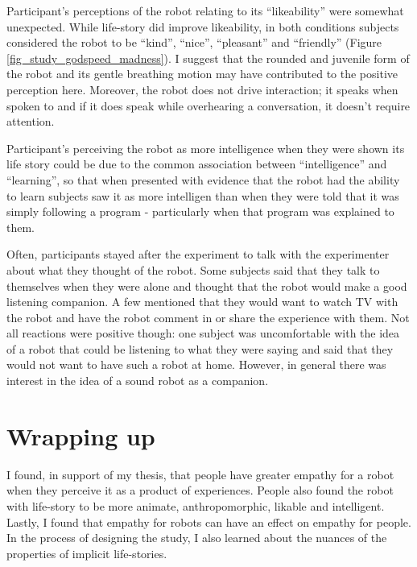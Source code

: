 Participant's perceptions of the robot relating to its ``likeability'' were somewhat unexpected. While life-story did improve likeability, in both conditions subjects considered the robot to be ``kind'', ``nice'', ``pleasant'' and ``friendly'' (Figure \ref{fig_study_godspeed_madness}). I suggest that the rounded and juvenile form of the robot and its gentle breathing motion may have contributed to the positive perception here. Moreover, the robot does not drive interaction; it speaks when spoken to and if it does speak while overhearing a conversation, it doesn't require attention.


Participant's perceiving the robot as more intelligence when they were shown its life story could be due to the common association between ``intelligence'' and ``learning'', so that when presented with evidence that the robot had the ability to learn subjects saw it as more intelligen than when they were told that it was simply following a program - particularly when that program was explained to them.

Often, participants stayed after the experiment to talk with the experimenter about what they thought of the robot. Some subjects said that they talk to themselves when they were alone and thought that the robot would make a good listening companion. A few mentioned that they would want to watch TV with the robot and have the robot comment in or share the experience with them. Not all reactions were positive though: one subject was uncomfortable with the idea of a robot that could be listening to what they were saying and said that they would not want to have such a robot at home. However, in general there was interest in the idea of a sound robot as a companion. 

 
\section{Wrapping up}

I found, in support of my thesis, that people have greater empathy for a robot when they perceive it as a product of experiences.  People also found the robot with life-story to be more animate, anthropomorphic, likable and intelligent. Lastly, I found that empathy for robots can have an effect on empathy for people. In the process of designing the study, I also learned about the nuances of the properties of implicit life-stories.




